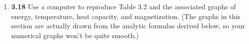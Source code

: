 \documentclass[fleqn]{article}
\begin{document}
\begin{enumerate}
    \pagebreak

    \item \textbf{3.18} Use a computer to reproduce Table 3.2 and the associated graphs of energy, temperature,
    heat capacity, and magnetization. (The graphs in this section are actually drawn from the analytic formulas
    derived below, so your numerical graphs won't be quite smooth.)


  \end{enumerate}
\end{document}
